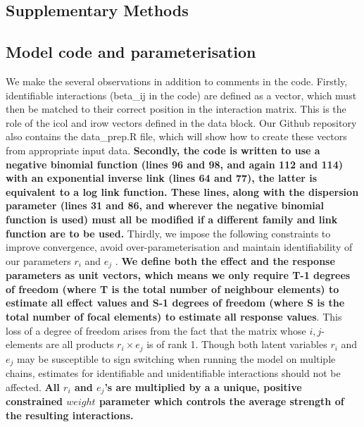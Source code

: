 
\setcounter{figure}{0}
\setcounter{section}{0}
\setcounter{table}{0}
\setcounter{equation}{0}
\renewcommand{\thefigure}{S\arabic{figure}}
\renewcommand{\thetable}{S\arabic{table}}
\renewcommand{\thesection}{S\arabic{section}}
\renewcommand{\theequation}{S\arabic{equation}}

\begin{refsection}

\section{Supplementary Methods}

\label{SI:Methods}

    \subsection{Model code and parameterisation}
    \label{SI:modelcode}
    

    We make the several observations in addition to comments in the code. Firstly, identifiable interactions (beta\_ij in the code) are defined as a vector, which must then be matched to their correct position in the interaction matrix. This is the role of the icol and irow vectors defined in the data block. Our Github repository also contains the data\_prep.R file, which will show how to create these vectors from appropriate input data. 
    \textbf{Secondly, the code is written to use a negative binomial function (lines 96 and 98, and again 112 and 114) with an exponential inverse link (lines 64 and 77), the latter is equivalent to a log link function. These lines, along with the dispersion parameter (lines 31 and 86, and wherever the negative binomial function is used) must all be modified if a different family and link function are to be used.}
    Thirdly, we impose the following constraints to improve convergence, avoid over-parameterisation and maintain identifiability of our parameters $r_i$ and $e_j$ \parencite{Huber2004, Kidzinski2020, Niku2021}. \textbf{We define both the effect and the response parameters as unit vectors, which means we only require T-1 degrees of freedom (where T is the total number of neighbour elements) to estimate all effect values and S-1 degrees of freedom (where S is the total number of focal elements) to estimate all response values}. This loss of a degree of freedom arises from the fact that the matrix whose $i,j$-elements are all products $r_i \times e_j$ is of rank 1. Though both latent variables $r_i$ and $e_j$ may be susceptible to sign switching when running the model on multiple chains, estimates for identifiable and unidentifiable interactions should not be affected. \textbf{All $r_i$ and $e_j$'s are multiplied by a a unique, positive constrained $weight$ parameter which controls the average strength of the resulting interactions.}



\end{refsection}

